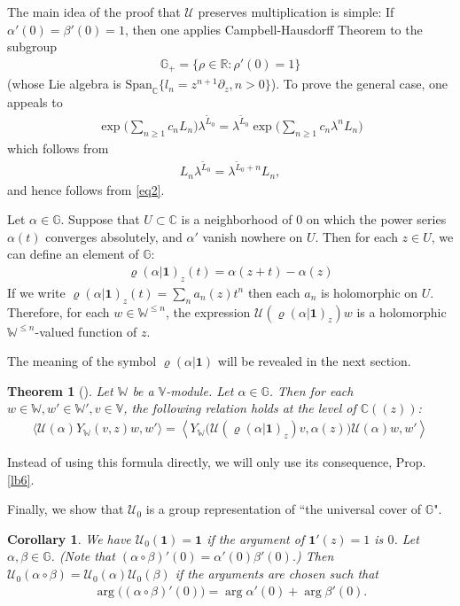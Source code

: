 \documentclass[11pt,b5paper,notitlepage]{article}
\theoremstyle{definition}
\theoremstyle{plain}
\newtheorem{thm}[df]{Theorem}
\newtheorem{co}[df]{Corollary}
\newcommand{\mc}{\mathcal}
\newcommand{\wtd}{\widetilde}
\newcommand{\id}{\mathbf{1}}
\newcommand{\Span}{\mathrm{Span}}
\newcommand{\bk}[1]{\langle {#1}\rangle}
\newcommand{\Vbb}{\mathbb V}
\newcommand{\Wbb}{\mathbb W}
\newcommand{\Gbb}{\mathbb G}
\newcommand{\Cbb}{\mathbb C}
\newcommand{\Rbb}{\mathbb R}
\numberwithin{equation}{section}
\begin{document}
The main idea of the proof that $\mc U$ preserves multiplication is simple: If $\alpha'(0)=\beta'(0)=1$, then one applies Campbell-Hausdorff Theorem to the subgroup \index{G+@$\Gbb_+$}
\begin{align*}
\Gbb_+=\{\rho\in\Rbb:\rho'(0)=1\}
\end{align*}
(whose Lie algebra is $\Span_\Cbb\{l_n=z^{n+1}\partial_z,n>0\}$). To prove the general case, one appeals to
\begin{align}
\exp\Big(\sum_{n\geq 1}c_nL_n \Big)\lambda^{\wtd L_0}=\lambda^{\wtd L_0}\exp\Big(\sum_{n\geq 1}c_n\lambda^n L_n \Big)\label{eq80}
\end{align}
which follows from
\begin{align}
L_n\lambda^{\wtd L_0}=\lambda^{\wtd L_0+n}L_n,
\end{align}
and hence follows from \eqref{eq2}.


Let $\alpha\in\Gbb$. Suppose that $U\subset\Cbb$ is a neighborhood of $0$ on which the power series $\alpha(t)$ converges absolutely, and $\alpha'$ vanish nowhere on $U$. Then for each $z\in U$, we can define an element of $\Gbb$:
\begin{align}
\varrho(\alpha|\id)_z(t)=\alpha(z+t)-\alpha(z)  \label{eq3}
\end{align}
If we write $\varrho(\alpha|\id)_z(t)=\sum_n a_n(z)t^n$ then each $a_n$ is holomorphic on $U$. Therefore, for each $w\in\Wbb^{\leq n}$, the expression $\mc U(\varrho(\alpha|\id)_z)w$ is a holomorphic $\Wbb^{\leq n}$-valued function of $z$.

The meaning of the symbol $\varrho(\alpha|\id)$ will be revealed in the next section.

\begin{thm}[\cite{Hua97}] \label{lb5}
Let $\Wbb$ be a $\Vbb$-module. Let $\alpha\in\Gbb$. Then for each $w\in\Wbb,w'\in\Wbb',v\in\Vbb$, the following relation holds at the level of $\Cbb((z))$:
\begin{align*}
\bk{\mc U(\alpha)Y_\Wbb(v,z)w,w'}=\left\langle Y_\Wbb\big(\mc U(\varrho(\alpha|\id)_z)v,\alpha(z)\big)\mc U(\alpha)w,w' \right\rangle
\end{align*}
\end{thm}

Instead of using this formula directly, we will only use its consequence, Prop. \ref{lb6}.


Finally, we show that $\mc U_0$ is a group representation of ``the universal cover of $\Gbb$".

\begin{co}\label{lb29}
We have $\mc U_0(\id)=\id$ if the argument of $\id'(z)=1$ is $0$. Let $\alpha,\beta\in\Gbb$. (Note that $(\alpha\circ\beta)'(0)=\alpha'(0)\beta'(0)$.) Then $\mc U_0(\alpha\circ\beta)=\mc U_0(\alpha)\mc U_0(\beta)$ if the arguments are chosen such that
\begin{align*}
\arg\big((\alpha\circ\beta)'(0)\big)=\arg\alpha'(0)+\arg\beta'(0).
\end{align*}
\end{co}
\end{document}
